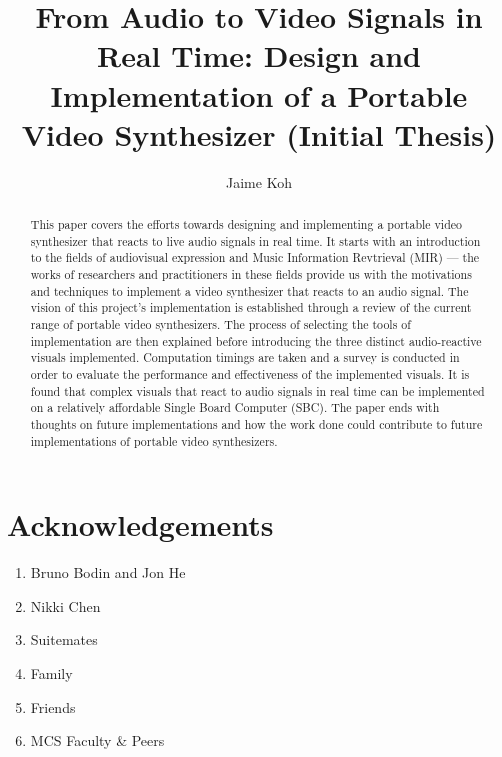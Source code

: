 \documentclass{report}
\title{From Audio to Video Signals in Real Time: Design and Implementation of a Portable Video Synthesizer (Initial Thesis)}
\author{Jaime Koh}
\begin{document}

% 
\chapter*{Acknowledgements}
\markright{}

\begin{enumerate}
\item Bruno Bodin and Jon He
\item Nikki Chen
\item Suitemates
\item Family
\item Friends
\item MCS Faculty \& Peers
\end{enumerate}

\begin{abstract}
This paper covers the efforts towards designing and implementing a portable video synthesizer that reacts to live audio signals in real time. It starts with an introduction to the fields of audiovisual expression and Music Information Revtrieval (MIR) --- the works of researchers and practitioners in these fields provide us with the motivations and techniques to implement a video synthesizer that reacts to an audio signal. The vision of this project's implementation is established through a review of the current range of portable video synthesizers. The process of selecting the tools of implementation are then explained before introducing the three distinct audio-reactive visuals implemented. Computation timings are taken and a survey is conducted in order to evaluate the performance and effectiveness of the implemented visuals. It is found that complex visuals that react to audio signals in real time can be implemented on a relatively affordable Single Board Computer (SBC). The paper ends with thoughts on future implementations and how the work done could contribute to future implementations of portable video synthesizers.
\end{abstract}

\newpage
\tableofcontents
\newpage
\end{document}
